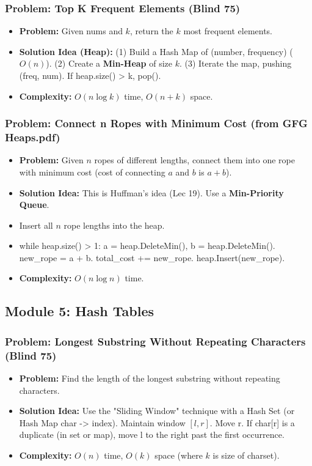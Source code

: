 \subsubsection{Problem: Top K Frequent Elements (Blind 75)}
\begin{itemize}
\item \textbf{Problem:} Given nums and $k$, return the $k$ most frequent elements.
\item \textbf{Solution Idea (Heap):} (1) Build a Hash Map of (number, frequency) ($O(n)$). (2) Create a \textbf{Min-Heap} of size $k$. (3) Iterate the map, pushing (freq, num). If heap.size() > k, pop().
\item \textbf{Complexity:} $O(n \log k)$ time, $O(n+k)$ space.
\end{itemize}

\subsubsection{Problem: Connect n Ropes with Minimum Cost (from GFG Heaps.pdf)}
\begin{itemize}
\item \textbf{Problem:} Given $n$ ropes of different lengths, connect them into one rope with minimum cost (cost of connecting $a$ and $b$ is $a+b$).
\item \textbf{Solution Idea:} This is Huffman's idea (Lec 19). Use a \textbf{Min-Priority Queue}.
\item Insert all $n$ rope lengths into the heap.
\item while heap.size() > 1: a = heap.DeleteMin(), b = heap.DeleteMin(). new\_rope = a + b. total\_cost += new\_rope. heap.Insert(new\_rope).
\item \textbf{Complexity:} $O(n \log n)$ time.
\end{itemize}

\subsection{Module 5: Hash Tables}

\subsubsection{Problem: Longest Substring Without Repeating Characters (Blind 75)}
\begin{itemize}
\item \textbf{Problem:} Find the length of the longest substring without repeating characters.
\item \textbf{Solution Idea:} Use the "Sliding Window" technique with a Hash Set (or Hash Map char -> index). Maintain window $[l, r]$. Move r. If char[r] is a duplicate (in set or map), move l to the right past the first occurrence.
\item \textbf{Complexity:} $O(n)$ time, $O(k)$ space (where $k$ is size of charset).
\end{itemize}

